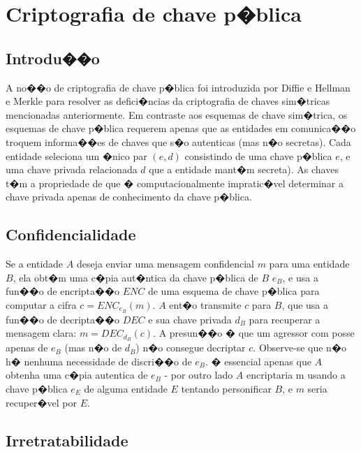 \documentclass[a4paper,capchap,espacoduplo,normaltoc]{abntepusp}
\begin{document}
\section{Criptografia de chave p�blica}

\subsection{Introdu��o}
A no��o de criptografia de chave p�blica foi introduzida por Diffie e Hellman \cite{diffie-hellman} e Merkle \cite{merkle} para resolver as defici�ncias da criptografia de chaves sim�tricas mencionadas anteriormente. Em contraste aos esquemas de chave sim�trica, os esquemas de chave p�blica requerem apenas que as entidades em comunica��o troquem informa��es de chaves que s�o autenticas (mas n�o secretas). Cada entidade seleciona um �nico par $(e,d)$ consistindo de uma chave p�blica $e$, e uma chave privada relacionada $d$ que a entidade mant�m secreta). As chaves t�m a propriedade de que � computacionalmente impratic�vel determinar a chave privada apenas de conhecimento da chave p�blica.

\subsection{Confidencialidade}

Se a entidade $A$ deseja enviar uma mensagem confidencial $m$ para uma entidade $B$, ela obt�m uma c�pia aut�ntica da chave p�blica de $B$ $e_{B}$, e usa a fun��o de encripta��o $ENC$ de uma esquema de chave p�blica para computar a cifra $c = ENC_{e_{B}}(m)$. $A$ ent�o transmite $c$ para $B$, que usa a fun��o de decripta��o $DEC$ e sua chave privada $d_{B}$ para recuperar a mensagem clara: $m = DEC_{d_{B}}(c)$. A presun��o � que um agressor com posse apenas de $e_{B}$ (mas n�o de $d_{B}$) n�o consegue decriptar $c$. Observe-se que n�o h� nenhuma necessidade de discri��o de $e_{B}$. � essencial apenas que $A$ obtenha uma c�pia autentica de $e_{B}$ - por outro lado $A$ encriptaria m usando a chave p�blica $e_{E}$ de alguma entidade $E$ tentando personificar $B$, e $m$ seria recuper�vel por $E$.

\subsection{Irretratabilidade}
\end{document}

